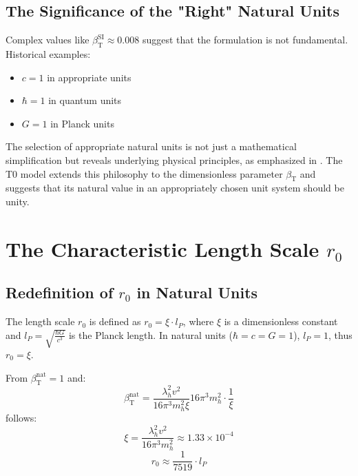 \documentclass[12pt,a4paper]{article}
\newcommand{\betaT}{\beta_{\text{T}}}
\begin{document}
	\subsection{The Significance of the "Right" Natural Units}
	\label{subsec:right_natural_units}
	
	Complex values like \(\betaT^{\text{SI}} \approx 0.008\) suggest that the formulation is not fundamental. Historical examples:
	\begin{itemize}
		\item \(c = 1\) in appropriate units
		\item \(\hbar = 1\) in quantum units
		\item \(G = 1\) in Planck units
	\end{itemize}
	
	The selection of appropriate natural units is not just a mathematical simplification but reveals underlying physical principles, as emphasized in \cite{pascher_zeit_masse_2025}. The T0 model extends this philosophy to the dimensionless parameter \(\betaT\) and suggests that its natural value in an appropriately chosen unit system should be unity.
	
	\section{The Characteristic Length Scale \(r_0\)}
	\label{sec:length_scale}
	
	\subsection{Redefinition of \(r_0\) in Natural Units}
	\label{subsec:r0_redefinition}
	
	The length scale \(r_0\) is defined as \(r_0 = \xi \cdot l_P\), where \(\xi\) is a dimensionless constant and \(l_P = \sqrt{\frac{\hbar G}{c^3}}\) is the Planck length. In natural units (\(\hbar = c = G = 1\)), \(l_P = 1\), thus \(r_0 = \xi\).
	
	From \(\betaT^{\text{nat}} = 1\) and:
	\begin{equation}
		\betaT^{\text{nat}} = \frac{\lambda_h^2 v^2}{16\pi^3 m_h^2 \xi}{16\pi^3 m_h^2} \cdot \frac{1}{\xi}
	\end{equation}
	follows:
	\begin{equation}
		\xi = \frac{\lambda_h^2 v^2}{16\pi^3 m_h^2} \approx 1.33 \times 10^{-4}
	\end{equation}
	\begin{equation}
		r_0 \approx \frac{1}{7519} \cdot l_P
	\end{equation}
	
\end{document}
